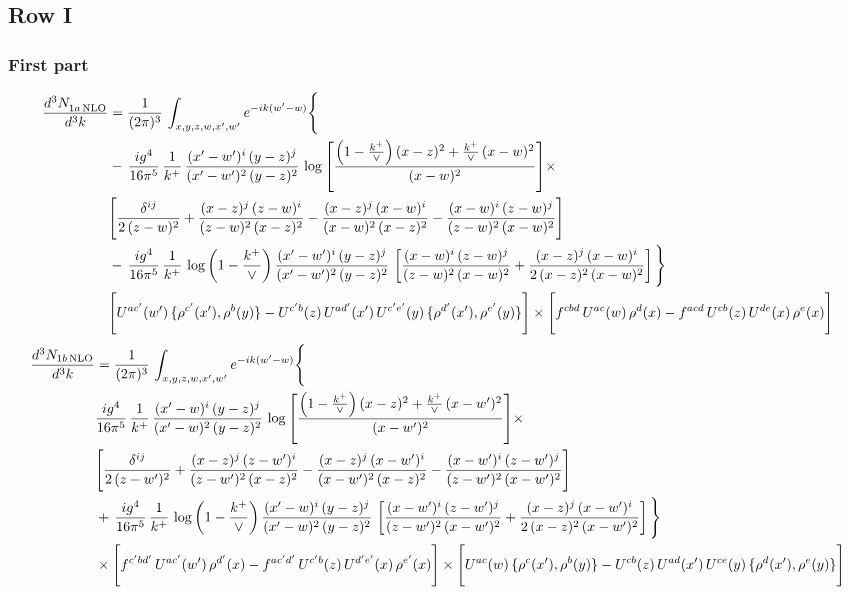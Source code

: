 \documentclass[9pt]{article}
\numberwithin{equation}{section}
\begin{document}
\subsection{Row I}
\subsubsection{First part}
\begin{align}
 \frac{d^{3}N_{1a\,\rm NLO}^{\rm}}{d^{3}k}  & =     \frac{1}{(2\pi)^{3}}\,\int_{x,y,z,w,x',w^{\prime}} e^{-ik(w^{\prime}-w)}\Bigg\{\notag \\
& -\, \frac{ig^{4}}{16\pi^{5}}\,\frac{1}{k^{+}}\, \frac{(x'-w')^{i}\,(y-z)^{j}}{(x'-w')^{2}\,(y-z)^{2}}\,\log{\left[\frac{\left(1-\frac{k^{+}}{\vee}\right)(x-z)^{2}+\frac{k^{+}}{\vee}\,(x-w)^{2}}{(x-w)^{2}}\right]}\times\notag \\ &  \Bigg[\frac{\delta^{ij}}{2\,(z-w)^{2}}+\frac{(x-z)^{j}\,(z-w)^{i}}{(z-w)^{2}\,(x-z)^{2}}-\frac{(x-z)^{j}\,(x-w)^{i}}{(x-w)^{2}\,(x-z)^{2}}-\frac{(x-w)^{i}\,(z-w)^{j}}{(z-w)^{2}\,(x-w)^{2}}\Bigg] \notag \\
& -\, \frac{ig^{4}}{16\pi^{5}}\,\frac{1}{k^{+}}\,\log{\left(1-\frac{k^{+}}{\vee}\right)}\,\frac{(x'-w')^{i}\,(y-z)^{j}}{(x'-w')^{2}\,(y-z)^{2}}\,\left[\frac{(x-w)^{i}\,(z-w)^{j}}{(z-w)^{2}\,(x-w)^{2}}+\frac{(x-z)^{j}\,(x-w)^{i}}{2\,(x-z)^{2}\, (x-w)^{2}}\right]\Bigg\} \notag \\ & \Bigg[U^{ac'}(w')\,\{\rho^{c'}(x'),\rho^{b}(y)\}-U^{c'b}(z)\,U^{ad'}(x')\,U^{c'e'}(y)\, \{\rho^{d'}(x'),\rho^{e'}(y)\}\Bigg]\times \Bigg[f^{cbd}\,U^{ac}(w)\,\rho^{d}(x)-f^{acd}\, U^{cb}(z)\,U^{de}(x)\,\rho^{e}(x)\Bigg]
\end{align}
\begin{align}
\frac{d^{3}N_{1b\, \rm NLO}}{d^{3}k} & =  \frac{1}{(2\pi)^{3}}\,\int_{x,y,z,w,x',w^{\prime}} e^{-ik(w^{\prime}-w)}\Bigg\{\notag \\
&  \frac{ig^{4}}{16\pi^{5}}\,\frac{1}{k^{+}}\, \frac{(x'-w)^{i}\,(y-z)^{j}}{(x'-w)^{2}\,(y-z)^{2}}\,\log{\left[\frac{\left(1-\frac{k^{+}}{\vee}\right)(x-z)^{2}+\frac{k^{+}}{\vee}\,(x-w')^{2}}{(x-w')^{2}}\right]}\times\notag \\ &  \Bigg[\frac{\delta^{ij}}{2\,(z-w')^{2}}+\frac{(x-z)^{j}\,(z-w')^{i}}{(z-w')^{2}\,(x-z)^{2}}-\frac{(x-z)^{j}\,(x-w')^{i}}{(x-w')^{2}\,(x-z)^{2}}-\frac{(x-w')^{i}\,(z-w')^{j}}{(z-w')^{2}\,(x-w')^{2}}\Bigg] \notag \\
& +\,\frac{ig^{4}}{16\pi^{5}}\,\frac{1}{k^{+}}\,\log{\left(1-\frac{k^{+}}{\vee}\right)}\,\frac{(x'-w)^{i}\,(y-z)^{j}}{(x'-w)^{2}\,(y-z)^{2}}\,\left[\frac{(x-w')^{i}\,(z-w')^{j}}{(z-w')^{2}\,(x-w')^{2}}+\frac{(x-z)^{j}\,(x-w')^{i}}{2\,(x-z)^{2}\, (x-w')^{2}}\right]\Bigg\} \notag \\ & \times\Bigg[f^{c'bd'}\,U^{ac'}(w')\,\rho^{d'}(x)-f^{ac'd'}\, U^{c'b}(z)\,U^{d'e'}(x)\,\rho^{e'}(x)\Bigg] \times \Bigg[U^{ac}(w)\,\{\rho^{c}(x'),\rho^{b}(y)\}-U^{cb}(z)\,U^{ad}(x')\,U^{ce}(y)\, \{\rho^{d}(x'),\rho^{e}(y)\}\Bigg]
\end{align}
\end{document}
